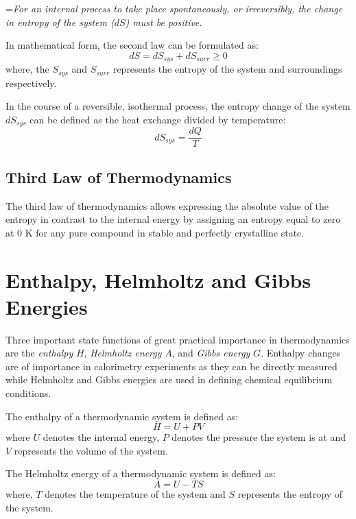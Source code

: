 	\hangindent=\parindent \emph{For an internal process to take place spontaneously, or irreversibly, the change in entropy of the system ($dS$) must be positive.}

	\noindent In mathematical form, the second law can be formulated as:
	\begin{equation}\label{eqn:slot}
		dS = dS_{sys} + dS_{surr} \geq 0
	\end{equation}
	where, the $S_{sys}$ and $S_{surr}$ represents the entropy of the system and surroundings respectively.

	In the course of a reversible, isothermal process, the entropy change of the system $dS_{sys}$   can be defined as the heat exchange divided by temperature:
	\begin{equation}\label{eqn:slotrev}
		dS_{sys} = \frac{dQ}{T}
	\end{equation}

	\subsection{Third Law of Thermodynamics}
	The third law of thermodynamics allows expressing the absolute value of the entropy in contrast to the internal energy by assigning an entropy equal to zero at 0 K for any pure compound in stable and perfectly crystalline state.

\section{Enthalpy, Helmholtz and Gibbs Energies}
		Three important state functions of great practical importance in thermodynamics are the \emph{enthalpy} $H$, \emph{Helmholtz energy} $A$, and \emph{Gibbs energy} $G$. Enthalpy changes are of importance in calorimetry experiments as they can be directly measured while Helmholtz and Gibbs energies are used in defining chemical equilibrium conditions.

		The enthalpy of a thermodynamic system is defined as:
		\begin{equation}
			H = U + PV
		\end{equation}
		where $U$ denotes the internal energy, $P$ denotes the pressure the system is at and $V$ represents the volume of the system.

		The Helmholtz energy of a thermodynamic system is defined as:
		\begin{equation}
			A = U - TS
		\end{equation}
		where, $T$ denotes the temperature of  the system and $S$ represents the entropy of the system.

